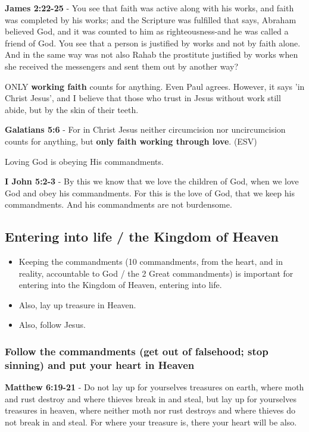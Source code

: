 \documentclass[11pt]{article}
\begin{document}
\textbf{James 2:22-25} - You see that faith was active along with his works, and faith was completed by his works; and the Scripture was fulfilled that says, Abraham believed God, and it was counted to him as righteousness-and he was called a friend of God.  You see that a person is justified by works and not by faith alone.  And in the same way was not also Rahab the prostitute justified by works when she received the messengers and sent them out by another way?

ONLY \textbf{working faith} counts for anything. Even Paul agrees. However, it says 'in Christ Jesus', and I believe that those who trust in Jesus without work still abide, but by the skin of their teeth.

\textbf{Galatians 5:6} - For in Christ Jesus neither circumcision nor uncircumcision counts for anything, but \textbf{only faith working through love}. (ESV)

Loving God is obeying His commandments.

\textbf{I John 5:2-3} - By this we know that we love the children of God, when we love God and obey his commandments. For this is the love of God, that we keep his commandments. And his commandments are not burdensome.

\subsection{Entering into life / the Kingdom of Heaven}
\label{sec:orgee1e541}
\begin{itemize}
\item Keeping the commandments (10 commandments, from the heart, and in reality, accountable to God / the 2 Great commandments) is important for entering into the Kingdom of Heaven, entering into life.
\item Also, lay up treasure in Heaven.
\item Also, follow Jesus.
\end{itemize}

\subsubsection{Follow the commandments (get out of falsehood; stop sinning) and put your heart in Heaven}
\label{sec:org59a07dd}
\textbf{Matthew 6:19-21} - Do not lay up for yourselves treasures on earth, where moth and rust destroy and where thieves break in and steal, but lay up for yourselves treasures in heaven, where neither moth nor rust destroys and where thieves do not break in and steal.  For where your treasure is, there your heart will be also.
\end{document}
